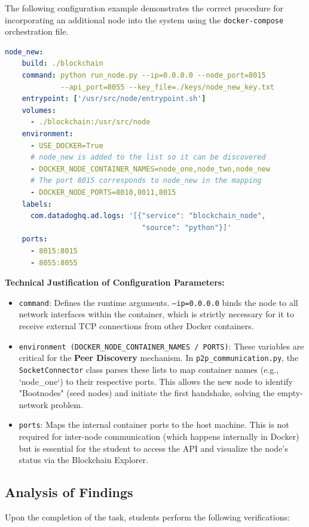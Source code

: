 The following configuration example demonstrates the correct procedure for incorporating an additional node into the system using the \texttt{docker-compose} orchestration file.
\begin{lstlisting}[language=yaml, caption=Docker Compose Solution, label=lst:mod1_docker]
node_new:
    build: ./blockchain
    command: python run_node.py --ip=0.0.0.0 --node_port=8015 
             --api_port=8055 --key_file=./keys/node_new_key.txt
    entrypoint: ['/usr/src/node/entrypoint.sh']
    volumes:
      - ./blockchain:/usr/src/node
    environment:
      - USE_DOCKER=True
      # node_new is added to the list so it can be discovered
      - DOCKER_NODE_CONTAINER_NAMES=node_one,node_two,node_new
      # The port 8015 corresponds to node_new in the mapping
      - DOCKER_NODE_PORTS=8010,8011,8015
    labels:
      com.datadoghq.ad.logs: '[{"service": "blockchain_node", 
                                "source": "python"}]'
    ports:
      - 8015:8015
      - 8055:8055
\end{lstlisting}

\textbf{Technical Justification of Configuration Parameters:}
\begin{itemize}
    \item \texttt{command}: Defines the runtime arguments. \texttt{--ip=0.0.0.0} binds the node to all network interfaces within the container, which is strictly necessary for it to receive external TCP connections from other Docker containers.
    \item \texttt{environment (DOCKER\_NODE\_CONTAINER\_NAMES / PORTS)}: These variables are critical for the \textbf{Peer Discovery} mechanism. In \texttt{p2p\_communication.py}, the \texttt{SocketConnector} class parses these lists to map container names (e.g., `node\_one`) to their respective ports. This allows the new node to identify "Bootnodes" (seed nodes) and initiate the first handshake, solving the empty-network problem.
    \item \texttt{ports}: Maps the internal container ports to the host machine. This is not required for inter-node communication (which happens internally in Docker) but is essential for the student to access the API and visualize the node's status via the Blockchain Explorer.
\end{itemize}

\subsection{Analysis of Findings}
Upon the completion of the task, students perform the following verifications:


